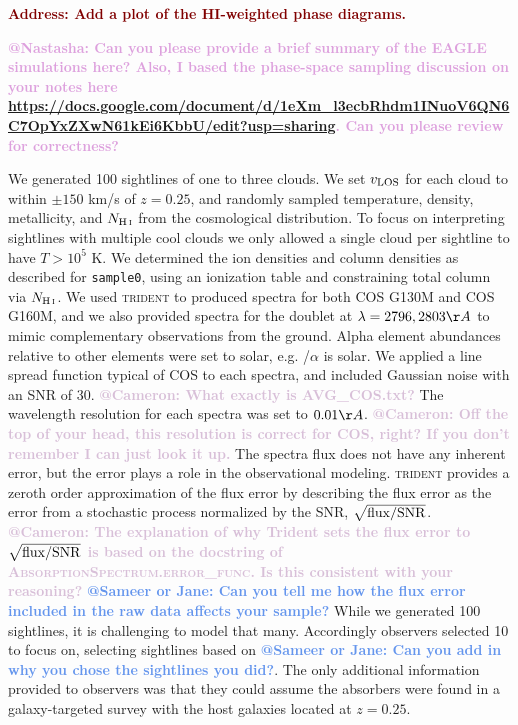 \documentclass[fleqn,usenatbib]{mnras}
\makeatletter
\newcommand{\todo}[1]{\textcolor{Maroon}{\textbf{Address: #1}}}
\newcommand{\atsameer}[1]{\textcolor{CornflowerBlue}{\textbf{@Sameer or Jane: #1}}}
\newcommand{\atcameron}[1]{\textcolor{Thistle}{\textbf{@Cameron: #1}}}
\newcommand{\atnastasha}[1]{\textcolor{Plum}{\textbf{@Nastasha: #1}}}
\makeatother
\begin{document}
\todo{Add a plot of the HI-weighted phase diagrams.}

\atnastasha{
Can you please provide a brief summary of the EAGLE simulations here?
Also, I based the phase-space sampling discussion on your notes here \url{https://docs.google.com/document/d/1eXm_l3ecbRhdm1INuoV6QN6C7OpYxZXwN61kEi6KbbU/edit?usp=sharing}.
Can you please review for correctness?
}

We generated 100 sightlines of one to three clouds.
We set $v_{\rm LOS}$ for each cloud to within $\pm150$ km/s of $z=0.25$, and randomly sampled temperature, density, metallicity, and $N_{\ion{H}{I}}$ from the cosmological distribution.
To focus on interpreting sightlines with multiple cool clouds we only allowed a single cloud per sightline to have $T>10^5$ K.
We determined the ion densities and column densities as described for \texttt{sample0}, using an ionization table and constraining total column via $N_{\ion{H}{I}}$.
We used \textsc{trident} to produced spectra for both COS G130M and COS G160M, and we also provided spectra for the  doublet at $\lambda = 2796, 2803 \AA$ to mimic complementary observations from the ground.
Alpha element abundances relative to other elements were set to solar, e.g. /$\alpha$ is solar.
We applied a line spread function typical of COS to each spectra, and included Gaussian noise with an SNR of 30.
\atcameron{What exactly is AVG\_COS.txt?}
The wavelength resolution for each spectra was set to $0.01 \AA$.
\atcameron{Off the top of your head, this resolution is correct for COS, right?
If you don't remember I can just look it up.}
The spectra flux does not have any inherent error, but the error plays a role in the observational modeling.
\textsc{trident} provides a zeroth order approximation of the flux error by describing the flux error as the error from a stochastic process normalized by the SNR, $\sqrt{{\rm flux}/{\rm SNR}}$.
\atcameron{The explanation of why Trident sets the flux error to $\sqrt{{\rm flux}/{\rm SNR}}$ is based on the docstring of \textsc{AbsorptionSpectrum.error\_func}.
Is this consistent with your reasoning?}
\atsameer{Can you tell me how the flux error included in the raw data affects your sample?}
While we generated 100 sightlines, it is challenging to model that many.
Accordingly observers selected 10 to focus on, selecting sightlines based on \atsameer{Can you add in why you chose the sightlines you did?}.
The only additional information provided to observers was that they could assume the absorbers were found in a galaxy-targeted survey with the host galaxies located at $z=0.25$.
\end{document}
